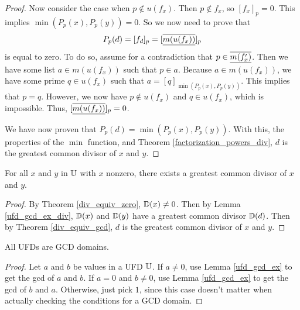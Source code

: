 \documentclass[../../math.tex]{subfiles}
\begin{document}
\begin{proof}
    Now consider the case when $p \notin u(f_x)$.  Then $p \notin f_x$, so
    $[f_x]_p = 0$.  This implies $\min(P_p(x), P_p(y)) = 0$.  So we now need to
    prove that
    \[
        P_p(d)
        = [f_d]_p
        = [\underline{\overline{m(u(f_x))}}]_p
    \]
    is equal to zero.  To do so, assume for a contradiction that $p \in
    \underline{\overline{m(f_x')}}$.  Then we have some list $a \in m(u(f_x))$ such that $p
    \in a$.  Because $a \in m(u(f_x))$, we have some prime $q \in u(f_x)$ such
    that $a = [q]_{\min(P_p(x), P_p(y))}$.  This implies that $p = q$.  However,
    we now have $p \notin u(f_x)$ and $q \in u(f_x)$, which is impossible.
    Thus, $[\underline{\overline{m(u(f_x))}}]_p = 0$.

    We have now proven that $P_p(d) = \min(P_p(x), P_p(y))$.  With this, the
    properties of the $\min$ function, and Theorem
    \ref{factorization_powers_div}, $d$ is the greatest common divisor of $x$
    and $y$.
\end{proof}

\begin{lemma} \label{ufd_gcd_ex}
    For all $x$ and $y$ in $\mathbb{U}$ with $x$ nonzero, there exists a greatest common
    divisor of $x$ and $y$.
\end{lemma}
\begin{proof}
    By Theorem \ref{div_equiv_zero}, $\mathbb{D}(x) \neq 0$.  Then by Lemma
    \ref{ufd_gcd_ex_div}, $\mathbb{D}(x)$ and $\mathbb{D}(y)$ have a greatest common divisor
    $\mathbb{D}(d)$.  Then by Theorem \ref{div_equiv_gcd}, $d$ is the greatest common
    divisor of $x$ and $y$.
\end{proof}

\begin{instance}
    All UFDs are GCD domains.
\end{instance}
\begin{proof}
    Let $a$ and $b$ be values in a UFD $\mathbb{U}$.  If $a \neq 0$, use Lemma
    \ref{ufd_gcd_ex} to get the gcd of $a$ and $b$.  If $a = 0$ and $b \neq 0$,
    use Lemma \ref{ufd_gcd_ex} to get the gcd of $b$ and $a$.  Otherwise, just
    pick $1$, since this case doesn't matter when actually checking the
    conditions for a GCD domain.
\end{proof}
\end{document}
